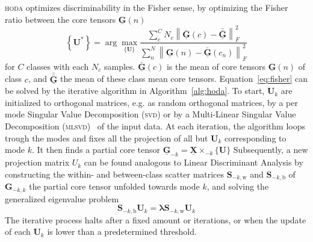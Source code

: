\documentclass[twocolumn]{article}
\newcommand{\ten}[1]{\underline{\mathbf{#1}}} %
\newcommand{\mat}[1]{\mathbf{#1}} %
\newcommand{\mmprs}[2]{\times_{-#2}\{#1\}} %
\begin{document}
\textsc{hoda} optimizes discriminability in the Fisher sense, by optimizing the
Fisher ratio between the core tensors $\ten{G}(n)$
\begin{equation}
  \left\{\mat{U}^*\right\} = \arg\max_{\{\mat{U}\}}
	\frac{\sum_c^CN_c\left\lVert\bar{\ten{G}}(c)-\bar{\bar{\ten{G}}}\right\rVert_F^2}
	{\sum_n^N\left\lVert\ten{G}(n)-\bar{\ten{G}}(c_n)\right\rVert_F^2}
	\label{eq:fisher}
\end{equation}
for $C$ classes with each $N_c$ samples. $\bar{\ten{G}}(c)$ is the mean of core
tensors $\ten{G}(n)$ of class $c$, and $\bar{\bar{\ten{G}}}$ the mean of
these class mean core tensors.
Equation~\ref{eq:fisher} can be solved by the iterative algorithm in
Algorithm~\ref{alg:hoda}.
To start, $\mat{U}_k$ are initialized to orthogonal matrices, e.g. as random
orthogonal matrices, by a per mode Singular Value Decomposition (\textsc{svd})
or by a Multi-Linear Singular Value Decomposition (\textsc{mlsvd})~\cite{Lathauwer2000} of the input data.
At each iteration, the algorithm loops trough the modes and fixes all the
projection of all but $\mat{U}_k$ corresponding to mode $k$.
It then finds a partial core tensor $\ten{G}_{-k}=\ten{X}\mmprs{\mat{U}}{k}$
Subsequently, a new projection matrix $U_k$ can be found analogous to Linear
Discriminant Analysis by constructing the within- and between-class scatter
matrices $\mat{S}_{-k,\text{w}}$ and $\mat{S}_{-k,\text{b}}$ of
$\mat{G}_{-k,k}$ the partial core tensor unfolded towards mode $k$, and solving
the generalized eigenvalue problem
\begin{equation}
  \mat{S}_{-k,\text{b}}\mat{U}_k = \mat{\lambda}\mat{S}_{-k,\text{w}}\mat{U}_k
\end{equation}
The iterative process halts after a fixed amount or iterations, or when the
update of each $\mat{U}_k$ is lower than a predetermined threshold.
\end{document}
